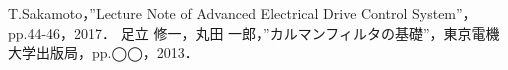 \documentclass[a4paper,12pt]{jarticle}
\begin{document}




\begin{thebibliography}{99}
 T.Sakamoto，”Lecture Note of Advanced Electrical Drive Control System”，pp.44-46，2017．
 足立 修一，丸田 一郎，”カルマンフィルタの基礎”，東京電機大学出版局，pp.◯◯，2013．
\end{thebibliography}
\end{document}
